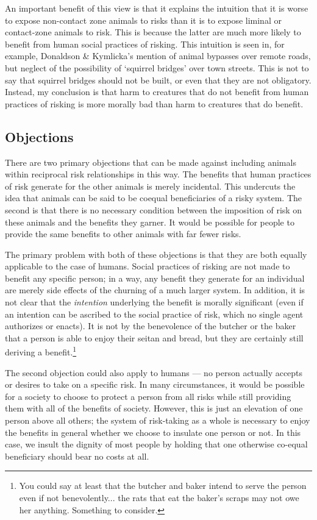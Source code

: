 An important benefit of this view is that it explains the intuition that it is
worse to expose non-contact zone animals to risks than it is to expose liminal
or contact-zone animals to risk. This is because the latter are
much more likely to benefit from human social practices of risking. This
intuition is seen in, for example, Donaldson \& Kymlicka’s mention of
animal bypasses over remote roads, but neglect of the possibility of ‘squirrel
bridges’ over town streets.\autocite[167]{zoopolis} This is not to say that squirrel
bridges should not be built, or even that they are not obligatory. Instead, my
conclusion is that harm to creatures that do not benefit from human practices
of risking is more morally bad than harm to creatures that do benefit.

\subsection{Objections}

There are two primary objections that can be made against including animals
within reciprocal risk relationships in this way. The benefits that human
practices of risk generate for the other animals is merely incidental. This
undercuts the idea that animals can be said to be coequal beneficiaries of a
risky system.  The second is that there is no necessary condition between the
imposition of risk on these animals and the benefits they garner. It would be
possible for people to provide the same benefits to other animals with far
fewer risks.

The primary problem with both of these objections is that they are both equally
applicable to the case of humans. Social practices of risking are not made to
benefit any specific person; in a way, any benefit they generate for an
individual are merely side effects of the churning of a much larger system. In
addition, it is not clear that the \emph{intention} underlying the benefit is
morally significant (even if an intention can be ascribed to the social
practice of risk, which no single agent authorizes or enacts). It is not by the
benevolence of the butcher or the baker that a person is able to enjoy their
seitan and bread, but they are certainly still deriving a benefit.\footnote{You
could say at least that the butcher and baker intend to serve the person even
if not benevolently... the rats that eat the baker’s scraps may not owe her
anything. Something to consider.}

The second objection could also apply to humans --- no person actually accepts
or desires to take on a specific risk. In many circumstances, it would be
possible for a society to choose to protect a person from all risks while still
providing them with all of the benefits of society. However, this is just an
elevation of one person above all others; the system of risk-taking as a whole
is necessary to enjoy the benefits in general whether we choose to insulate one
person or not. In this case, we insult the dignity of most people by holding
that one otherwise co-equal beneficiary should bear no costs at all.

